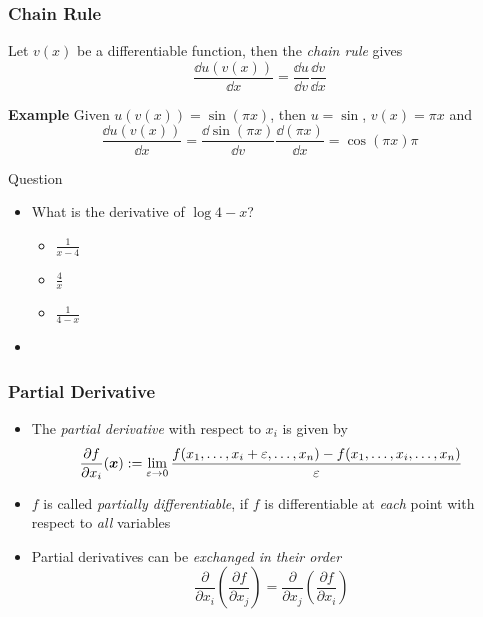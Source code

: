 \documentclass[%
  final,
  11pt, 
  show notes, %
  t, %
  fleqn, %
]{beamer}
\begin{document}
\begin{frame}
  \frametitle{Chain Rule}
Let $v(x)$ be a differentiable function, then the \emph{chain rule} gives
\begin{equation*}
\frac{\dd u(v(x))}{\dd x} = \frac{\dd u}{\dd v} \frac{\dd v}{\dd x} 
\end{equation*}

\vspace*{0.3cm}
\textbf{Example} Given 
$u(v(x)) = \sin{(\pi x)}$, 
 then $u = \sin$, $v(x) = \pi x$ and
\begin{equation*}
\frac{\dd u(v(x))}{\dd x} = \frac{\dd \sin{(\pi x)}}{\dd v} \frac{\dd (\pi x)}{\dd x} = \cos{(\pi x)} \pi 
\end{equation*}

\begin{exampleblock}{Question}
\begin{itemize}
\item What is the derivative of $\log{4-x}$?
\begin{itemize}
\item $\frac{1}{x-4}$
\item $\frac{4}{x}$
\item $\frac{1}{4-x}$
\end{itemize}
\item \CourseQuiz
\end{itemize}
\end{exampleblock}
%
\end{frame}

\begin{frame}
  \frametitle{Partial Derivative}
\begin{itemize}
\item The \emph{partial derivative} with respect to $x_i$ is given by 
\begin{equation*}
\frac{\partial f}{\partial x_i}(\vecval{x}) \define \lim_{\varepsilon \to 0} \frac{f(x_1, \ldots, x_i + \varepsilon, \ldots, x_n) - f(x_1, \ldots, x_i, \ldots, x_n)}{\varepsilon}
\end{equation*}
\item $f$ is called \emph{partially differentiable}, if $f$ is differentiable at \emph{each} point with respect to \emph{all} variables
\item Partial derivatives can be \emph{exchanged in their order}
\begin{equation*}
\frac{\partial}{\partial x_i} \left( \frac{\partial f}{\partial x_j} \right) = \frac{\partial}{\partial x_j} \left( \frac{\partial f}{\partial x_i} \right)
\end{equation*}
\end{itemize}
\end{frame}
\end{document}
